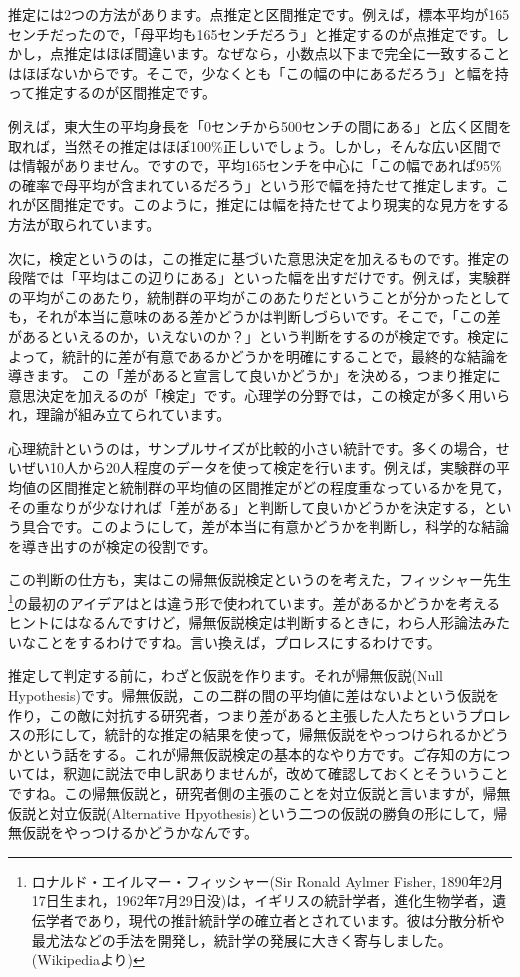 \documentclass{ltjsbook}
\begin{document}
推定には2つの方法があります。点推定と区間推定です。例えば，標本平均が165センチだったので，「母平均も165センチだろう」と推定するのが点推定です。しかし，点推定はほぼ間違います。なぜなら，小数点以下まで完全に一致することはほぼないからです。そこで，少なくとも「この幅の中にあるだろう」と幅を持って推定するのが区間推定です。

例えば，東大生の平均身長を「0センチから500センチの間にある」と広く区間を取れば，当然その推定はほぼ100\%正しいでしょう。しかし，そんな広い区間では情報がありません。ですので，平均165センチを中心に「この幅であれば95\%の確率で母平均が含まれているだろう」という形で幅を持たせて推定します。これが区間推定です。このように，推定には幅を持たせてより現実的な見方をする方法が取られています。

次に，検定というのは，この推定に基づいた意思決定を加えるものです。推定の段階では「平均はこの辺りにある」といった幅を出すだけです。例えば，実験群の平均がこのあたり，統制群の平均がこのあたりだということが分かったとしても，それが本当に意味のある差かどうかは判断しづらいです。そこで，「この差があるといえるのか，いえないのか？」という判断をするのが検定です。検定によって，統計的に差が有意であるかどうかを明確にすることで，最終的な結論を導きます。
この「差があると宣言して良いかどうか」を決める，つまり推定に意思決定を加えるのが「検定」です。心理学の分野では，この検定が多く用いられ，理論が組み立てられています。

心理統計というのは，サンプルサイズが比較的小さい統計です。多くの場合，せいぜい10人から20人程度のデータを使って検定を行います。例えば，実験群の平均値の区間推定と統制群の平均値の区間推定がどの程度重なっているかを見て，その重なりが少なければ「差がある」と判断して良いかどうかを決定する，という具合です。このようにして，差が本当に有意かどうかを判断し，科学的な結論を導き出すのが検定の役割です。

この判断の仕方も，実はこの帰無仮説検定というのを考えた，フィッシャー先生\footnote{ロナルド・エイルマー・フィッシャー(Sir Ronald Aylmer Fisher, 1890年2月17日生まれ，1962年7月29日没)は，イギリスの統計学者，進化生物学者，遺伝学者であり，現代の推計統計学の確立者とされています。彼は分散分析や最尤法などの手法を開発し，統計学の発展に大きく寄与しました。(Wikipediaより)}の最初のアイデアはとは違う形で使われています。差があるかどうかを考えるヒントにはなるんですけど，帰無仮説検定は判断するときに，わら人形論法みたいなことをするわけですね。言い換えば，プロレスにするわけです。

推定して判定する前に，わざと仮説を作ります。それが帰無仮説(Null Hypothesis)です。帰無仮説，この二群の間の平均値に差はないよという仮説を作り，この敵に対抗する研究者，つまり差があると主張した人たちというプロレスの形にして，統計的な推定の結果を使って，帰無仮説をやっつけられるかどうかという話をする。これが帰無仮説検定の基本的なやり方です。ご存知の方については，釈迦に説法で申し訳ありませんが，改めて確認しておくとそういうことですね。この帰無仮説と，研究者側の主張のことを対立仮説と言いますが，帰無仮説と対立仮説(Alternative Hpyothesis)という二つの仮説の勝負の形にして，帰無仮説をやっつけるかどうかなんです。
\end{document}
